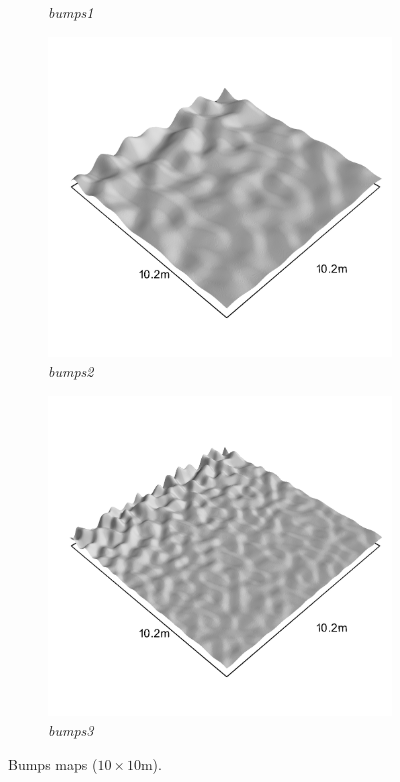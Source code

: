 \documentclass[../document.tex]{subfiles}
\begin{document}
\begin{figure}[htbp]
\begin{subfigure}[b]{0.32\linewidth}
            \caption{\emph{bumps1}}
            \end{subfigure}    
          \begin{subfigure}[b]{0.32\textwidth}
            \includegraphics[width=\textwidth]{../img/hm3d_borders/bumps2.png}
            \caption{\emph{bumps2}}
        \end{subfigure}    
        \begin{subfigure}[b]{0.32\textwidth}
            \includegraphics[width=\textwidth]{../img/hm3d_borders/bumps3.png}
            \caption{\emph{bumps3}}
        \end{subfigure}    
    \caption{Bumps maps ($10\times10$m).}
\end{figure}
\end{document}
